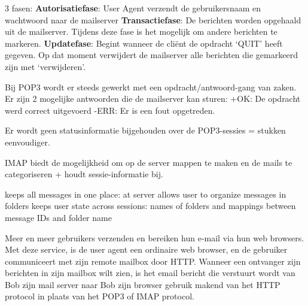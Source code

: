 3 fasen:
\be
\itf \textbf{Autorisatiefase}: User Agent verzendt de gebruikersnaam en wachtwoord naar de mailserver
\itf \textbf{Transactiefase}: De berichten worden opgehaald uit de mailserver. Tijdens deze fase is het mogelijk om andere berichten te markeren.
\itf \textbf{Updatefase}: Begint wanneer de cliënt de opdracht ‘QUIT’ heeft gegeven. Op dat moment verwijdert de mailserver alle berichten die gemarkeerd zijn met ‘verwijderen’.
\ee

\noindent Bij POP3 wordt er steeds gewerkt met een opdracht/antwoord-gang van zaken. Er zijn 2 mogelijke antwoorden die de mailserver kan sturen:
\bi
\itf +OK: De opdracht werd correct uitgevoerd
\itf -ERR: Er is een fout opgetreden.
\ei

\noindent Er wordt geen statusinformatie bijgehouden over de POP3-sessies = stukken eenvoudiger.


IMAP biedt de mogelijkheid om op de server mappen te maken en de mails te categoriseren + houdt sessie-informatie bij.

\bi
\itf keeps all messages in one place: at server
\itf allows user to organize messages in folders
\itf keeps user state across sessions:
\bi
\itf names of folders and mappings between message IDs and folder name
\ei
\ei


Meer en meer gebruikers verzenden en bereiken hun e-mail via hun web browsers. Met deze service, is de user agent een ordinaire web browser, en de gebruiker communiceert met zijn remote mailbox door HTTP. Wanneer een ontvanger zijn berichten in zijn mailbox wilt zien, is het email bericht die verstuurt wordt van Bob zijn mail server naar Bob zijn browser gebruik makend van het HTTP protocol in plaats van het POP3 of IMAP protocol.
